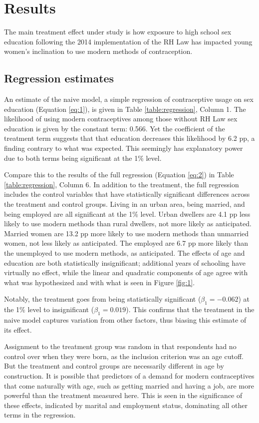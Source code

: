 \documentclass[12pt]{article}
\begin{document}
\section{Results}
The main treatment effect under study is how exposure to high school sex education following the 2014 implementation of the RH Law has impacted young women's inclination to use modern methods of contraception.


    \subsection{Regression estimates}
    An estimate of the naive model, a simple regression of contraceptive usage on sex education (Equation \ref{eq:1}), is given in Table \ref{table:regression}, Column 1.
    The likelihood of using modern contraceptives among those without RH Law sex education is given by the constant term: 0.566.
    Yet the coefficient of the treatment term suggests that that education decreases this likelihood by 6.2 pp, a finding contrary to what was expected.
    This seemingly has explanatory power due to both terms being significant at the 1\% level.

    Compare this to the results of the full regression (Equation \ref{eq:2}) in Table \ref{table:regression}, Column 6.
    In addition to the treatment, the full regression includes the control variables that have statistically significant differences across the treatment and control groups.
    Living in an urban area, being married, and being employed are all significant at the 1\% level.
    Urban dwellers are 4.1 pp less likely to use modern methods than rural dwellers, not more likely as anticipated.
    Married women are 13.2 pp more likely to use modern methods than unmarried women, not less likely as anticipated.
    The employed are 6.7 pp more likely than the unemployed to use modern methods, as anticipated.
    The effects of age and education are both statistically insignificant; additional years of schooling have virtually no effect, while the linear and quadratic components of age agree with what was hypothesized and with what is seen in Figure \ref{fig:1}.

    Notably, the treatment goes from being statistically significant ($\beta_1 = -0.062$) at the 1\% level to insignificant ($\beta_1 = 0.019$).
    This confirms that the treatment in the naive model captures variation from other factors, thus biasing this estimate of its effect.

    Assignment to the treatment group was random in that respondents had no control over when they were born, as the inclusion criterion was an age cutoff.
    But the treatment and control groups are necessarily different in age by construction.
    It is possible that predictors of a demand for modern contraceptives that come naturally with age, such as getting married and having a job, are more powerful than the treatment measured here.
    This is seen in the significance of these effects, indicated by marital and employment status, dominating all other terms in the regression.
\end{document}
